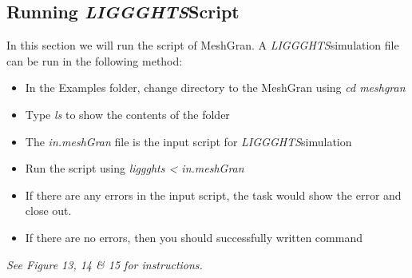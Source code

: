 \documentclass{tufte-book} %
\newcommand{\Li}{\textit{LIGGGHTS}}
\begin{document}
\subsection{Running \Li Script}



 In this section we will run the script of MeshGran. A \Li simulation file can be run in the following method:
\begin{itemize}
 \item In the Examples folder, change directory to the MeshGran using \textit{\emph{cd meshgran}}
 \item Type \textit{\emph{ls}} to show the contents of the folder
 \item The \textit{\emph{in.meshGran}} file is the input script for \Li simulation
 \item Run the script using \textit{\emph{liggghts < in.meshGran}}
 \item If there are any errors in the input script, the task would show the error and close out. 
 \item If there are no errors, then you should successfully written command
 \end{itemize}
\emph{ See Figure 13, 14 \& 15 for instructions. }
\end{document}

